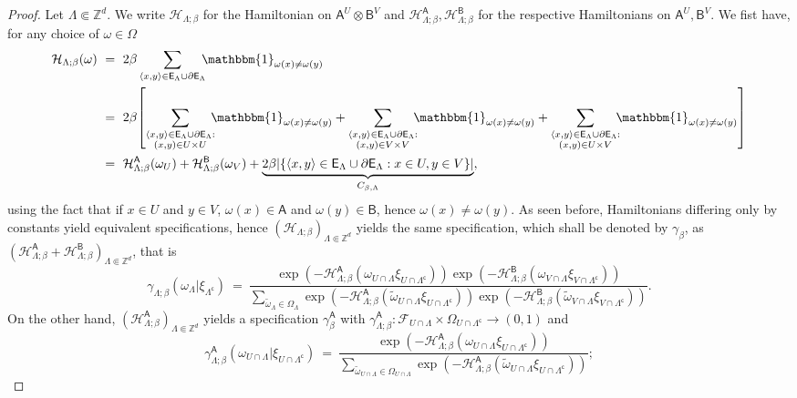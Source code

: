\documentclass[12pt]{article}
\renewcommand{\AA}{\mathsf{A}}
\newcommand{\AB}{\mathsf{B}}
\newcommand{\E}{\mathsf{E}}
\newcommand{\F}{\mathcal{F}}
\renewcommand{\H}{\mathcal{H}}
\newcommand{\Z}{\mathbb{Z}}
\newcommand{\oglati}[1]{\left[#1\right]}
\newcommand{\ra}{\rightarrow}
\newcommand{\1}{\mathbbm{1}}
\renewcommand{\sp}[1]{\langle #1\rangle}
\renewcommand{\c}{\mathsf{c}}
\newcommand{\5}{\vspace{0.5cm}}
\renewcommand{\tilde}{\widetilde}
\theoremstyle{definition}
\begin{document}
\begin{proof}
Let $\Lambda\Subset\Z^d$. We write $\H_{\Lambda;\beta}$ for the Hamiltonian on $\AA^U\otimes\AB^V$ and $\H_{\Lambda;\beta}^\AA,\H_{\Lambda;\beta}^{\AB}$ for the respective Hamiltonians on $\AA^U,\AB^V$. We fist have, for any choice of $\omega\in\Omega$ 
\begin{align*}
\H_{\Lambda;\beta}(\omega) ~&=~ 2\beta\sum_{\sp{x,y}\in\E_\Lambda\cup\partial\E_\Lambda}\!\!\!\1_{\omega(x)\neq\omega(y)} \\
&=~ 2\beta\!\oglati{\sum_{\substack{\sp{x,y}\in\E_\Lambda\cup\partial\E_\Lambda:\\(x,y)\in U\times U}}\!\!\!\1_{\omega(x)\neq\omega(y)}+\sum_{\substack{\sp{x,y}\in\E_\Lambda\cup\partial\E_\Lambda:\\(x,y)\in V\times V}}\!\!\!\1_{\omega(x)\neq\omega(y)}+\sum_{\substack{\sp{x,y}\in\E_\Lambda\cup\partial\E_\Lambda:\\(x,y)\in U\times V}}\!\!\!\1_{\omega(x)\neq\omega(y)}} \\
&=~ \H_{\Lambda;\beta}^\AA(\omega_U) + \H_{\Lambda;\beta}^\AB(\omega_V) + \underbrace{2\beta|\{\sp{x,y}\in\E_\Lambda\cup\partial\E_\Lambda:x\in U,y\in V\}|}_{C_{\beta,\Lambda}},
\end{align*}
using the fact that if $x\in U$ and $y\in V$, $\omega(x)\in\AA$ and $\omega(y)\in\AB$, hence $\omega(x)\neq\omega(y)$. As seen before, Hamiltonians differing only by constants yield equivalent specifications, hence $(\H_{\Lambda;\beta})_{\Lambda\Subset\Z^d}$ yields the same specification, which shall be denoted by $\gamma_\beta$, as $(\H_{\Lambda;\beta}^\AA+\H_{\Lambda;\beta}^\AB)_{\Lambda\Subset\Z^d}$, that is
$$\gamma_{\Lambda;\beta}(\omega_\Lambda|\xi_{\Lambda^\c}) ~=~ \frac{\exp(-\H_{\Lambda;\beta}^\AA(\omega_{U\cap\Lambda}\xi_{U\cap\Lambda^\c}))\exp(-\H_{\Lambda;\beta}^\AB(\omega_{V\cap\Lambda}\xi_{V\cap\Lambda^\c}))}{\sum_{\tilde{\omega}_\Lambda\in\Omega_\Lambda}\exp(-\H_{\Lambda;\beta}^\AA(\tilde{\omega}_{U\cap\Lambda}\xi_{U\cap\Lambda^\c}))\exp(-\H_{\Lambda;\beta}^\AB(\tilde{\omega}_{V\cap\Lambda}\xi_{V\cap\Lambda^\c}))}.$$
On the other hand, $(\H_{\Lambda;\beta}^\AA)_{\Lambda\Subset\Z^d}$ yields a specification $\gamma_\beta^\AA$ with $\gamma_{\Lambda;\beta}^\AA:\F_{U\cap\Lambda}\times\Omega_{U\cap\Lambda^\c}\ra(0,1)$ and
$$\gamma_{\Lambda;\beta}^\AA(\omega_{U\cap\Lambda}|\xi_{U\cap\Lambda^\c}) ~=~ \frac{\exp(-\H_{\Lambda;\beta}^{\AA}(\omega_{U\cap\Lambda}\xi_{U\cap\Lambda^\c}))}{\sum_{\tilde{\omega}_{U\cap\Lambda}\in\Omega_{U\cap\Lambda}}\exp(-\H_{\Lambda;\beta}^{\AA}(\tilde{\omega}_{U\cap\Lambda}\xi_{U\cap\Lambda^\c}))};$$

\end{proof}
\end{document}
